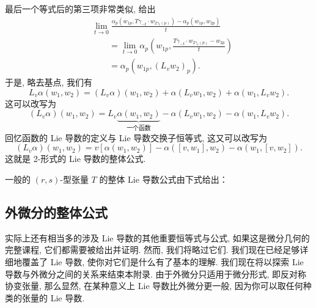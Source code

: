 最后一个等式后的第三项非常类似, 给出
\begin{align*}
&\lim_{t\to0}\frac{\alpha_p\left(w_{1p},T\gamma_{-t}\cdot w_{2\gamma_t(p)}\right)-\alpha_p\left(w_{1p},w_{2p}\right)}{t}\\
&\qquad=\lim_{t\to0}\alpha_p\left(w_{1p},\frac{T\gamma_{-t}\cdot w_{2\gamma_t(p)}-w_{2p}}{t}\right)\\
&\qquad=\alpha_p\left(w_{1p},\left(L_vw_2\right)_p\right).
\end{align*}
于是, 略去基点, 我们有
\[
L_v\alpha(w_1,w_2)=\left(L_v\alpha\right)(w_1,w_2)+\alpha(L_vw_1,w_2)+\alpha(w_1,L_vw_2).
\]
这可以改写为
\[
\left(L_v\alpha\right)(w_1,w_2)=L_v\underbrace{\alpha(w_1,w_2)}_{\text{一个函数}}-\alpha(L_vw_1,w_2)-\alpha(w_1,L_vw_2).
\]
回忆函数的 Lie 导数的定义与 Lie 导数交换子恒等式, 这又可以改写为
\[
\left(L_v\alpha\right)(w_1,w_2)=v\left[\alpha(w_1,w_2)\right]-\alpha([v,w_1],w_2)-\alpha(w_1,[v,w_2]).
\]
这就是 2-形式的 Lie 导数的整体公式.

\begin{center}
\end{center}

一般的 $(r,s)$-型张量 $T$ 的整体 Lie 导数公式由下式给出：
\begin{center}
\end{center}

\subsection{外微分的整体公式}

实际上还有相当多的涉及 Lie 导数的其他重要恒等式与公式, 如果这是微分几何的完整课程, 它们都需要被给出并证明. 然而, 我们将略过它们. 我们现在已经足够详细地覆盖了 Lie 导数, 使你对它们是什么有了基本的理解. 我们现在将以探索 Lie 导数与外微分之间的关系来结束本附录. 由于外微分只适用于微分形式, 即反对称协变张量, 那么显然, 在某种意义上 Lie 导数比外微分更一般, 因为你可以取任何种类的张量的 Lie 导数.

